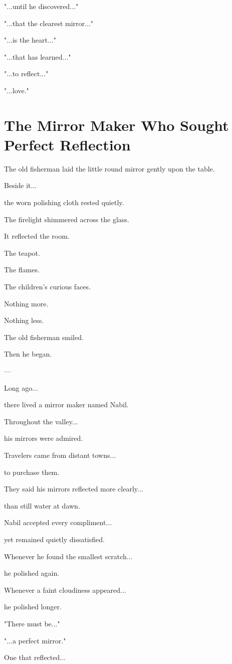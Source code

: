\documentclass[12pt,openany]{book}
\begin{document}
"...until he discovered..."

"...that the clearest mirror..."

"...is the heart..."

"...that has learned..."

"...to reflect..."

"...love."
\section*{The Mirror Maker Who Sought Perfect Reflection}

The old fisherman laid the little round mirror gently upon the table.

Beside it...

the worn polishing cloth rested quietly.

The firelight shimmered across the glass.

It reflected the room.

The teapot.

The flames.

The children's curious faces.

Nothing more.

Nothing less.

The old fisherman smiled.

Then he began.

---

Long ago...

there lived a mirror maker named Nabil.

Throughout the valley...

his mirrors were admired.

Travelers came from distant towns...

to purchase them.

They said his mirrors reflected more clearly...

than still water at dawn.

Nabil accepted every compliment...

yet remained quietly dissatisfied.

Whenever he found the smallest scratch...

he polished again.

Whenever a faint cloudiness appeared...

he polished longer.

"There must be..."

"...a perfect mirror."

One that reflected...
\end{document}
